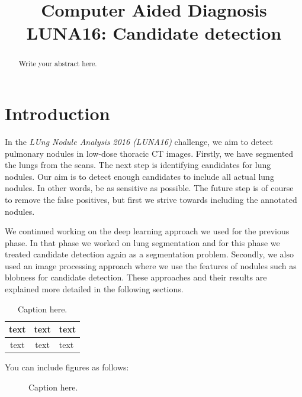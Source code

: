 \documentclass{article}
\title{Computer Aided Diagnosis\\LUNA16: Candidate detection}
\begin{document}
%
\maketitle
%
\begin{abstract}
Write your abstract here.
\end{abstract}


\section{Introduction}
\label{sec:intro}
In the \emph{LUng Nodule Analysis 2016 (LUNA16)} challenge, we aim to detect pulmonary nodules in low-dose thoracic CT images. Firstly, we have segmented the lungs from the scans. The next step is identifying candidates for lung nodules. Our aim is to detect enough candidates to include all actual lung nodules. In other words, be as sensitive as possible. The future step is of course to remove the false positives, but first we strive towards including the annotated nodules.

We continued working on the deep learning approach we used for the previous phase. In that phase we worked on lung segmentation and for this phase we treated candidate detection again as a segmentation problem. Secondly, we also used an image processing approach where we use the features of nodules such as blobness for candidate detection. These approaches and their results are explained more detailed in the following sections.

\begin{table}[h]
\caption{\small{Caption here.}}
\label{tab:parameters}
\centering
\begin{tabular}{c | c | l}
text & text & text\\
\hline \hline
text & text & text
\end{tabular}
\end{table}

You can include figures as follows:

\begin{figure}[h]
\centering
{}
\caption{Caption here. \label{figure:patterns}}
\end{figure}
\end{document}
